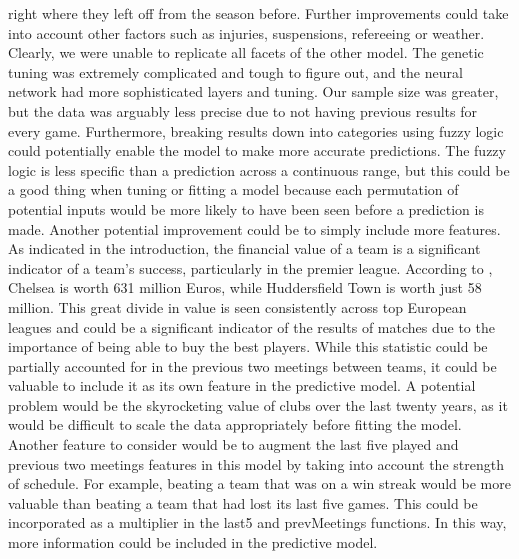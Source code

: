 \documentclass[sigconf]{acmart}
\begin{document}
right where they left off from the season before. Further improvements could take into account other factors such as injuries, suspensions, refereeing or weather. Clearly, we were unable to replicate all facets of the other model. The genetic tuning was extremely complicated and tough to figure out, and the neural network had more sophisticated layers and tuning. Our sample size was greater, but the data was arguably less precise due to not having previous results for every game. Furthermore, breaking results down into categories using fuzzy logic could potentially enable the model to make more accurate predictions. The fuzzy logic is less specific than a prediction across a continuous range, but this could be a good thing when tuning or fitting a model because each permutation of potential inputs would be more likely to have been seen before a prediction is made. 
Another potential improvement could be to simply include more features. As indicated in the introduction, the financial value of a team is a significant indicator of a team's success, particularly in the premier league. According to \cite{TransferMarkt}, Chelsea is worth 631 million Euros, while Huddersfield Town is worth just 58 million. This great divide in value is seen consistently across top European leagues and could be a significant indicator of the results of matches due to the importance of being able to buy the best players. While this statistic could be partially accounted for in the previous two meetings between teams, it could be valuable to include it as its own feature in the predictive model. A potential problem would be the skyrocketing value of clubs over the last twenty years, as it would be difficult to scale the data appropriately before fitting the model.
Another feature to consider would be to augment the last five played and previous two meetings features in this model by taking into account the strength of schedule. For example, beating a team that was on a win streak would be more valuable than beating a team that had lost its last five games. This could be incorporated as a multiplier in the last5 and prevMeetings functions. In this way, more information could be included in the predictive model.
\end{document}
